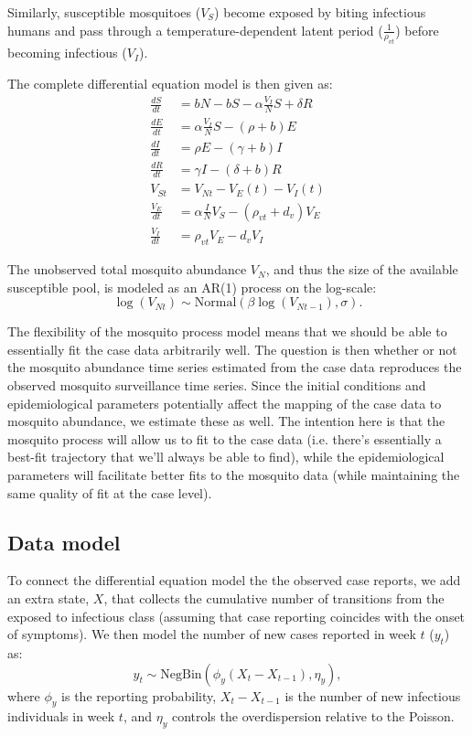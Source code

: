 \documentclass[10pt,letterpaper]{article}
\begin{document}
Similarly, susceptible mosquitoes ($V_S$) become exposed by biting infectious humans and pass through a temperature-dependent latent period ($\frac{1}{\rho_{vt}}$) before becoming infectious ($V_I$).

The complete differential equation model is then given as:
\begin{align} 
\frac{dS}{dt} &= bN - bS - \alpha \frac{V_{I}}{N} S + \delta R\\
\frac{dE}{dt} &= \alpha \frac{V_{I}}{N} S - (\rho + b)E\\
\frac{dI}{dt} &= \rho E - (\gamma + b)I\\
\frac{dR}{dt} &= \gamma I - (\delta + b)R\\
V_{St} & = V_{Nt} - V_E(t) - V_I(t)\\
\frac{V_E}{dt} &= \alpha \frac{I}{N} V_S - (\rho_{vt} + d_v)V_E\\
\frac{V_I}{dt} &= \rho_{vt} V_E - d_v V_I
\end{align}

The unobserved total mosquito abundance $V_N$, and thus the size of the available susceptible pool, is modeled as an AR(1) process on the log-scale:
\begin{equation}
\log(V_{Nt}) \sim \text{Normal}(\beta \log(V_{Nt-1}), \sigma).
\end{equation}

The flexibility of the mosquito process model means that we should be able to essentially fit the case data arbitrarily well.
The question is then whether or not the mosquito abundance time series estimated from the case data reproduces the observed mosquito surveillance time series.
Since the initial conditions and epidemiological parameters potentially affect the mapping of the case data to mosquito abundance, we estimate these as well.
The intention here is that the mosquito process will allow us to fit to the case data (i.e. there's essentially a best-fit trajectory that we'll always be able to find), while the epidemiological parameters will facilitate better fits to the mosquito data (while maintaining the same quality of fit at the case level).
\subsection*{Data model}

To connect the differential equation model the the observed case reports, we add an extra state, $X$, that collects the cumulative number of transitions from the exposed to infectious class (assuming that case reporting coincides with the onset of symptoms).
We then model the number of new cases reported in week $t$ ($y_t$) as:
\begin{equation}
y_t  \sim \text{NegBin}(\phi_y (X_t - X_{t-1}), \eta_y),
\end{equation}
where $\phi_y$ is the reporting probability, $X_t - X_{t-1}$ is the number of new infectious individuals in week $t$, and $\eta_y$ controls the overdispersion relative to the Poisson.
\end{document}
